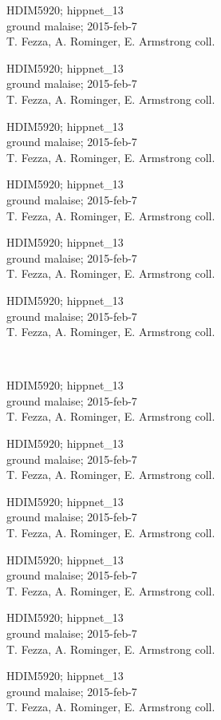 \documentclass[2pt]{extarticle}
\begin{document}
\noindent
\parbox{0.16\textwidth}{\tiny \raggedright \rule[-0.3\baselineskip]{0pt}{10pt}HDIM5920; hippnet\_13\\ ground malaise; 2015-feb-7\\ T. Fezza, A. Rominger, E. Armstrong coll.}
\parbox{0.16\textwidth}{\tiny \raggedright \rule[-0.3\baselineskip]{0pt}{10pt}HDIM5920; hippnet\_13\\ ground malaise; 2015-feb-7\\ T. Fezza, A. Rominger, E. Armstrong coll.}
\parbox{0.16\textwidth}{\tiny \raggedright \rule[-0.3\baselineskip]{0pt}{10pt}HDIM5920; hippnet\_13\\ ground malaise; 2015-feb-7\\ T. Fezza, A. Rominger, E. Armstrong coll.}
\parbox{0.16\textwidth}{\tiny \raggedright \rule[-0.3\baselineskip]{0pt}{10pt}HDIM5920; hippnet\_13\\ ground malaise; 2015-feb-7\\ T. Fezza, A. Rominger, E. Armstrong coll.}
\parbox{0.16\textwidth}{\tiny \raggedright \rule[-0.3\baselineskip]{0pt}{10pt}HDIM5920; hippnet\_13\\ ground malaise; 2015-feb-7\\ T. Fezza, A. Rominger, E. Armstrong coll.}
\parbox{0.16\textwidth}{\tiny \raggedright \rule[-0.3\baselineskip]{0pt}{10pt}HDIM5920; hippnet\_13\\ ground malaise; 2015-feb-7\\ T. Fezza, A. Rominger, E. Armstrong coll.} \\ 
\vspace{0.001in} 

\noindent
\parbox{0.16\textwidth}{\tiny \raggedright \rule[-0.3\baselineskip]{0pt}{10pt}HDIM5920; hippnet\_13\\ ground malaise; 2015-feb-7\\ T. Fezza, A. Rominger, E. Armstrong coll.}
\parbox{0.16\textwidth}{\tiny \raggedright \rule[-0.3\baselineskip]{0pt}{10pt}HDIM5920; hippnet\_13\\ ground malaise; 2015-feb-7\\ T. Fezza, A. Rominger, E. Armstrong coll.}
\parbox{0.16\textwidth}{\tiny \raggedright \rule[-0.3\baselineskip]{0pt}{10pt}HDIM5920; hippnet\_13\\ ground malaise; 2015-feb-7\\ T. Fezza, A. Rominger, E. Armstrong coll.}
\parbox{0.16\textwidth}{\tiny \raggedright \rule[-0.3\baselineskip]{0pt}{10pt}HDIM5920; hippnet\_13\\ ground malaise; 2015-feb-7\\ T. Fezza, A. Rominger, E. Armstrong coll.}
\parbox{0.16\textwidth}{\tiny \raggedright \rule[-0.3\baselineskip]{0pt}{10pt}HDIM5920; hippnet\_13\\ ground malaise; 2015-feb-7\\ T. Fezza, A. Rominger, E. Armstrong coll.}
\parbox{0.16\textwidth}{\tiny \raggedright \rule[-0.3\baselineskip]{0pt}{10pt}HDIM5920; hippnet\_13\\ ground malaise; 2015-feb-7\\ T. Fezza, A. Rominger, E. Armstrong coll.} \\ 
\vspace{0.001in} 
\end{document}
